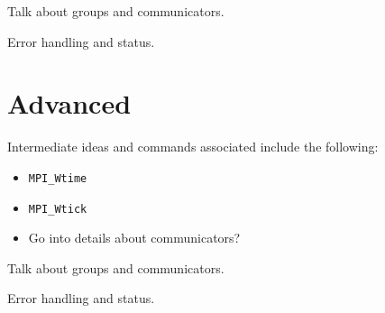 \todo Talk about groups and communicators.

\todo Error handling and status.

\section{Advanced}

\todo Intermediate ideas and commands associated include the following: \\
\begin{itemize}
\item \texttt{MPI\_Wtime}
\item \texttt{MPI\_Wtick}
\item Go into details about communicators?
\end{itemize}

\todo Talk about groups and communicators.

\todo Error handling and status.


